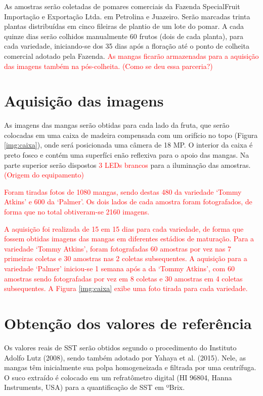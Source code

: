As amostras serão coletadas de pomares comerciais da Fazenda SpecialFruit Importação e Exportação Ltda. em Petrolina e Juazeiro. Serão marcadas trinta plantas distribuídas em cinco fileiras de plantio de um lote do pomar. A cada quinze dias serão colhidos manualmente 60 frutos (dois de cada planta), para cada variedade, iniciando-se dos 35 dias após a floração até o ponto de colheita comercial adotado pela Fazenda. \textcolor{red}{As mangas ficarão armazenadas para a aquisição das imagens também na pós-colheita. (Como se deu essa parceria?)}

\section{Aquisição das imagens}

As imagens das mangas serão obtidas para cada lado da fruta, que serão colocadas em uma caixa de madeira compensada com um orifício no topo (Figura \ref{img:caixa}), onde será posicionada uma câmera de 18 MP. O interior da caixa é preto fosco e contém uma superfíci enão reflexiva para o apoio das mangas. Na parte superior serão dispostos \textcolor{red}{3 LEDs brancos} para a iluminação das amostras. \textcolor{red}{(Origem do equipamento)}


\textcolor{red}{Foram tiradas fotos de 1080 mangas, sendo destas 480 da variedade ‘Tommy Atkins’ e 600 da ‘Palmer’. Os dois lados de cada amostra foram fotografados, de forma que no total obtiveram-se 2160 imagens.} 

\textcolor{red}{A aquisição foi realizada de 15 em 15 dias para cada variedade, de forma que fossem obtidas imagens das mangas em diferentes estádios de maturação. Para a variedade ‘Tommy Atkins’, foram fotografadas 60 amostras por vez nas 7 primeiras coletas e 30 amostras nas 2 coletas subsequentes. A aquisição para a variedade ‘Palmer’ iniciou-se 1 semana após a da ‘Tommy Atkins’, com 60 amostras sendo fotografadas por  vez em 8 coletas e 30 amostras em 4 coletas subsequentes. A Figura \ref{img:caixa} exibe uma foto tirada para cada variedade.}

\section{Obtenção dos valores de referência}

Os valores reais de SST serão obtidos segundo o procedimento do Instituto Adolfo Lutz (2008), sendo também adotado por Yahaya et al. (2015). Nele, as mangas têm inicialmente sua polpa homogeneizada e filtrada por uma centrífuga. O suco extraído é colocado em um refratômetro digital (HI 96804, Hanna Instruments, USA) para a quantificação de SST em ºBrix.

